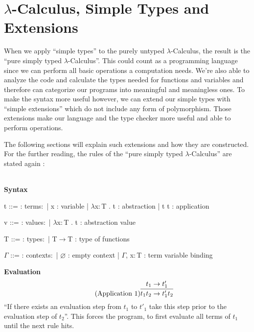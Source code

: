 \section{$\lambda$-Calculus, Simple Types and Extensions}

When we apply ``simple types'' to the purely untyped
$\lambda$-Calculus, the result is the ``pure simply typed $\lambda$-Calculus''.
This could count as a programming language since we can perform
all basic operations a computation needs. We're also able to analyze
the code and calculate the types needed for functions and variables
and therefore can categorize our programs into meaningful and
meaningless ones. To make the syntax more useful however, we can extend
our simple types with ``simple extensions'' which do not include any
form of polymorphism. Those extensions make our language and the type
checker more useful and able to perform operations.

The following sections will explain such extensions and how they are constructed.
For the further reading, the rules of the ``pure simply typed $\lambda$-Calculus''
are stated again \cite{pierce2002ProgLang}:

~\\
\textbf{Syntax}
\begin{bnfgrammar}
    t ::= : terms$\colon$
    | x : variable
    | $\lambda$x$\colon$T . t : abstraction
    | t t : application
\end{bnfgrammar}\leavevmode\newline

\begin{bnfgrammar}
    v ::= : values$\colon$
    | $\lambda$x$\colon$T . t : abstraction value
\end{bnfgrammar}\leavevmode\newline

\begin{bnfgrammar}
    T ::= : types$\colon$
    | T$\rightarrow$T : type of functions
\end{bnfgrammar}\leavevmode\newline

\begin{bnfgrammar}
    $\Gamma$ ::= : contexts$\colon$
    | $\varnothing$ : empty context
    | $\Gamma$, x$\colon$T : term variable binding
\end{bnfgrammar}\leavevmode\newline

\textbf{Evaluation}
\begin{equation*}
    \tag{Application 1}
    \infer{
        t_1 t_2 \rightarrow t'_1 t_2
    }{
        t_1 \rightarrow t'_1
    }
\end{equation*}
``If there exists an evaluation step from $t_1$ to $t'_1$ take this step
prior to the evaluation step of $t_2$''. This forces the program, to first
evaluate all terms of $t_1$ until the next rule hits.

